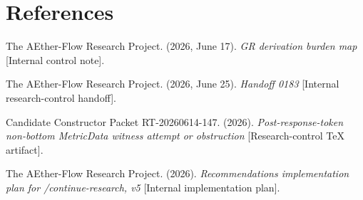 \documentclass[11pt]{article}
\begin{document}
\section*{References}

The AEther-Flow Research Project. (2026, June 17). \emph{GR derivation burden
map} [Internal control note].

The AEther-Flow Research Project. (2026, June 25). \emph{Handoff 0183}
[Internal research-control handoff].

Candidate Constructor Packet RT-20260614-147. (2026). \emph{Post-response-token
non-bottom MetricData witness attempt or obstruction} [Research-control TeX
artifact].

The AEther-Flow Research Project. (2026). \emph{Recommendations implementation
plan for /continue-research, v5} [Internal implementation plan].
\end{document}
